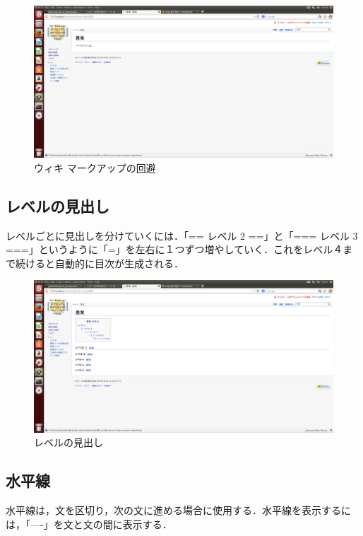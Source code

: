 \begin{figure}[htb]
\centering
\includegraphics[width=14cm]{ma-ku}
\caption{ウィキ マークアップの回避}\label{図}
\end{figure}

\subsection{レベルの見出し}

レベルごとに見出しを分けていくには．「== レベル 2 ==」と「=== レベル 3 ===」というように「=」を左右に１つずつ増やしていく．これをレベル４まで続けると自動的に目次が生成される．


\begin{figure}[htb]
\centering
\includegraphics[width=14cm]{reberu}
\caption{レベルの見出し}\label{図}
\end{figure}

\subsection{水平線}
水平線は，文を区切り，次の文に進める場合に使用する．水平線を表示するには，「----」を文と文の間に表示する．


